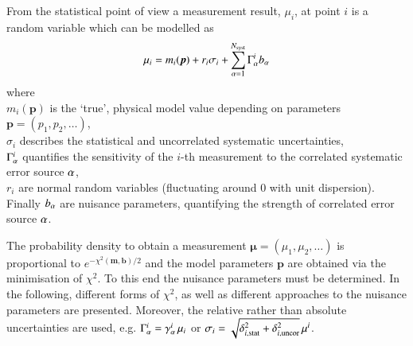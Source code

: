 From the statistical point of view a measurement result, $\mu_i$,
at point $i$ is a random variable which can be modelled as
\begin{equation}
\mu_i = m_i(\boldsymbol{p}) + r_i \sigma_i + \sum_{\alpha=1}^{N_\mathrm{syst}} \Gamma^i_\alpha b_\alpha
\end{equation}
where\\
$m_i(\boldsymbol p)$ is the `true', physical model value depending on parameters $\boldsymbol p = (p_1, p_2,\dots)$,\\
$\sigma_i$ describes the statistical and uncorrelated systematic uncertainties,\\
$\Gamma^i_\alpha$ quantifies the sensitivity of the $i$-th measurement to the correlated systematic error source $\alpha$,\\
$r_i$ are normal random variables (fluctuating around 0 with unit dispersion).\\
Finally $b_\alpha$ are nuisance parameters, quantifying the strength of correlated error source $\alpha$.

The probability density to obtain a measurement $\boldsymbol \mu = (\mu_1, \mu_2,\dots)$ is proportional to
$e^{-\chi^2(\boldsymbol{m},\boldsymbol{b})/2}$
and the model parameters $\boldsymbol p$ are obtained via the minimisation of $\chi^2$.
To this end the nuisance parameters must be determined.
In the following, different forms of $\chi^2$, as well as different approaches to the nuisance parameters are presented.
Moreover, the relative rather than absolute uncertainties are used, e.g.
$\Gamma^i_\alpha = \gamma^i_\alpha \,\mu_i$ or 
$\sigma_i = \sqrt{\delta_{i,{\rm stat}}^2 +\delta_{i,{\rm uncor}}^2}\,  \mu^i$.
\\

